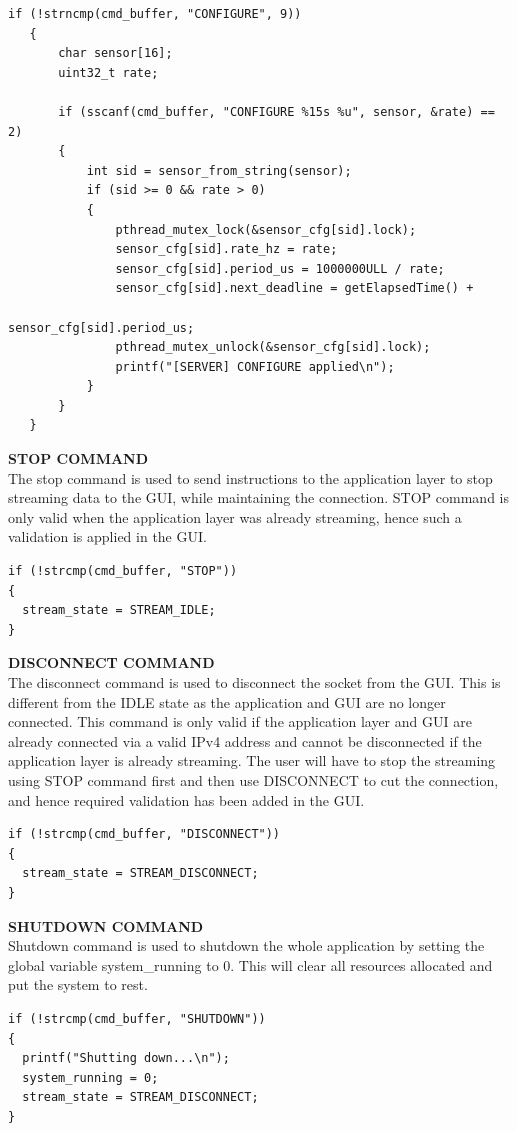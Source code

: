 \begin{verbatim}
if (!strncmp(cmd_buffer, "CONFIGURE", 9))
   {
       char sensor[16];
       uint32_t rate;

       if (sscanf(cmd_buffer, "CONFIGURE %15s %u", sensor, &rate) == 2)
       {
           int sid = sensor_from_string(sensor);
           if (sid >= 0 && rate > 0)
           {
               pthread_mutex_lock(&sensor_cfg[sid].lock);
               sensor_cfg[sid].rate_hz = rate;
               sensor_cfg[sid].period_us = 1000000ULL / rate;
               sensor_cfg[sid].next_deadline = getElapsedTime() + 
                                              sensor_cfg[sid].period_us;
               pthread_mutex_unlock(&sensor_cfg[sid].lock);
               printf("[SERVER] CONFIGURE applied\n");
           }
       }
   }
\end{verbatim}
\smallskip

\textbf{STOP COMMAND}\\
The stop command is used to send instructions to the application layer to stop streaming data to the GUI, while maintaining the connection. STOP command is only valid when the application layer was already streaming, hence such a validation is applied in the GUI. 

\begin{verbatim}
if (!strcmp(cmd_buffer, "STOP"))
{
  stream_state = STREAM_IDLE;
}
\end{verbatim}
\smallskip

\textbf{DISCONNECT COMMAND}\\
The disconnect command is used to disconnect the socket from the GUI. This is different from the IDLE state as the application and GUI are no longer connected. This command is only valid if the application layer and GUI are already connected via a valid IPv4 address and cannot be disconnected if the application layer is already streaming. The user will have to stop the streaming using STOP command first and then use DISCONNECT to cut the connection, and hence required validation has been added in the GUI.
\begin{verbatim}
if (!strcmp(cmd_buffer, "DISCONNECT"))
{
  stream_state = STREAM_DISCONNECT;
}
\end{verbatim}
\smallskip

\textbf{SHUTDOWN COMMAND}\\
Shutdown command is used to shutdown the whole application by setting the global variable system\_running to 0. This will clear all resources allocated and put the system to rest. 
\begin{verbatim}
if (!strcmp(cmd_buffer, "SHUTDOWN"))
{
  printf("Shutting down...\n");
  system_running = 0;
  stream_state = STREAM_DISCONNECT;
}
\end{verbatim}
\smallskip

